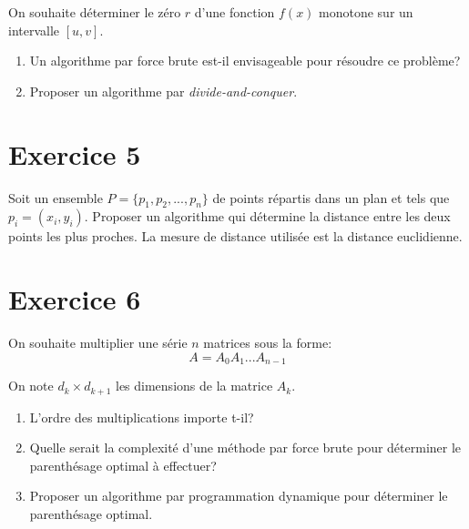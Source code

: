 \documentclass[a4paper,10pt]{article}
\begin{document}
On souhaite déterminer le zéro $r$ d'une fonction $f(x)$ monotone sur un intervalle $[u, v]$.

\begin{enumerate}
\item Un algorithme par force brute est-il envisageable pour résoudre ce problème?
\item Proposer un algorithme par \textit{divide-and-conquer}.
\end{enumerate}

\section*{Exercice 5}


Soit un ensemble $P = \{p_1, p_2, ..., p_n\}$ de points répartis dans un plan et tels que $p_i = (x_i, y_i)$. Proposer un algorithme qui détermine la distance entre les deux points les plus proches. La mesure de distance utilisée est la distance euclidienne.

\section*{Exercice 6}

On souhaite multiplier une série $n$ matrices sous la forme: $$A = A_0 A_1 ... A_{n-1}$$

On note $d_k \times d_{k+1}$ les dimensions de la matrice $A_k$.

\begin{enumerate}
\item L'ordre des multiplications importe t-il?
\item Quelle serait la complexité d'une méthode par force brute pour déterminer le parenthésage optimal à effectuer?
\item Proposer un algorithme par programmation dynamique pour déterminer le parenthésage optimal.
\end{enumerate}
\end{document}

